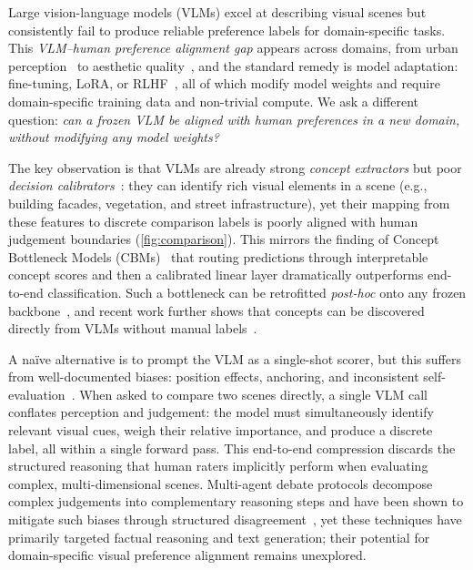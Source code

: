\documentclass[runningheads]{llncs}
\begin{document}
Large vision-language models (VLMs) excel at describing visual scenes but consistently fail to produce reliable preference labels for domain-specific tasks.
This \emph{VLM--human preference alignment gap} appears across domains, from urban perception~\cite{zhang2025genai,mushkani2025dovlms} to aesthetic quality~\cite{murray2012ava,wu2024qalign}, and the standard remedy is model adaptation: fine-tuning, LoRA, or RLHF~\cite{ouyang2022training}, all of which modify model weights and require domain-specific training data and non-trivial compute.
We ask a different question: \emph{can a frozen VLM be aligned with human preferences in a new domain, without modifying any model weights?}

The key observation is that VLMs are already strong \emph{concept extractors} but poor \emph{decision calibrators}~\cite{zhang2025genai,mushkani2025dovlms}: they can identify rich visual elements in a scene (e.g., building facades, vegetation, and street infrastructure), yet their mapping from these features to discrete comparison labels is poorly aligned with human judgement boundaries (\cref{fig:comparison}).
This mirrors the finding of Concept Bottleneck Models (CBMs)~\cite{koh2020concept} that routing predictions through interpretable concept scores and then a calibrated linear layer dramatically outperforms end-to-end classification.
Such a bottleneck can be retrofitted \emph{post-hoc} onto any frozen backbone~\cite{yuksekgonul2023posthoc}, and recent work further shows that concepts can be discovered directly from VLMs without manual labels~\cite{oikarinen2023labelfree,yang2023language}.

A na\"{i}ve alternative is to prompt the VLM as a single-shot scorer, but this suffers from well-documented biases: position effects, anchoring, and inconsistent self-evaluation~\cite{wu2024qalign,liu2024pairs}.
When asked to compare two scenes directly, a single VLM call conflates perception and judgement: the model must simultaneously identify relevant visual cues, weigh their relative importance, and produce a discrete label, all within a single forward pass.
This end-to-end compression discards the structured reasoning that human raters implicitly perform when evaluating complex, multi-dimensional scenes.
Multi-agent debate protocols decompose complex judgements into complementary reasoning steps and have been shown to mitigate such biases through structured disagreement~\cite{du2024improving,wang2023selfconsistency}, yet these techniques have primarily targeted factual reasoning and text generation; their potential for domain-specific visual preference alignment remains unexplored.
\end{document}
